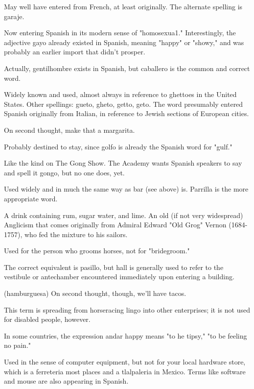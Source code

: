  May well have entered from French, at least originally. The alternate spelling is garaje.

 Now entering Spanish in its modern sense of "homosexua1." Interestingly, the adjective gayo already existed in Spanish,
meaning "happy" or "showy," and was probably an earlier import that
didn't prosper.

 Actually, gentilhombre exists in Spanish, but
caballero is the common and correct word.

 Widely known and used, almost always in reference
to ghettoes in the United States. Other spellings: gueto, gheto, getto,
geto. The word presumably entered Spanish originally from Italian, in
reference to Jewish sections of European cities.

 On second thought, make that a margarita.

 Probably destined to stay, since golfo is already the
Spanish word for "gulf."

 Like the kind on The Gong Show. The Academy
wants Spanish speakers to say and spell it gongo, but no one does, yet.

 Used widely and in much the same way as bar (see
above) is. Parrilla is the more appropriate word.

 A drink containing rum, sugar water, and lime. An old
(if not very widespread) Anglicism that comes originally from Admiral
Edward "Old Grog" Vernon (1684-1757), who fed the mixture to his
sailors.

 Used for the person who grooms horses, not for
"bridegroom."

 The correct equivalent is pasillo, but hall is generally
used to refer to the vestibule or antechamber encountered immediately
upon entering a building.

 (hamburguesa) On second thought, though,
we'll have tacos.

 This term is spreading from horseracing lingo
into other enterprises; it is not used for disabled people, however.

 In some countries, the expression andar happy means
"to he tipsy," "to be feeling no pain."

 Used in the sense of computer equipment, but
not for your local hardware store, which is a ferreteria most places and
a tlalpaleria in Mexico. Terms like software and mouse are also appearing in Spanish.

